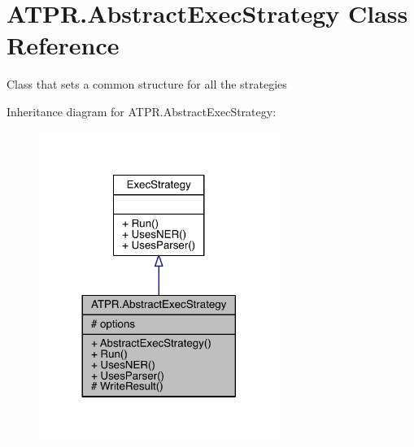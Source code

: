 \hypertarget{class_a_t_p_r_1_1_abstract_exec_strategy}{}\section{A\+T\+P\+R.\+Abstract\+Exec\+Strategy Class Reference}
\label{class_a_t_p_r_1_1_abstract_exec_strategy}


Class that sets a common structure for all the strategies  




Inheritance diagram for A\+T\+P\+R.\+Abstract\+Exec\+Strategy\+:
\nopagebreak
\begin{figure}[H]
\begin{center}
\leavevmode
\includegraphics[width=221pt]{d8/dec/class_a_t_p_r_1_1_abstract_exec_strategy__inherit__graph}
\end{center}
\end{figure}


